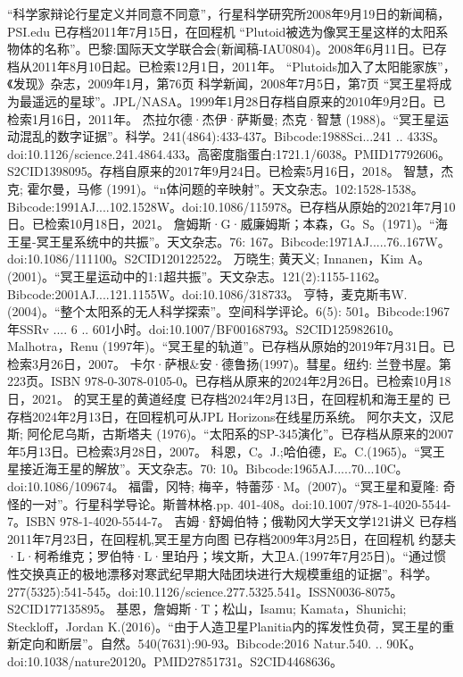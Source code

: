 \begin{enumerate}
 “科学家辩论行星定义并同意不同意”，行星科学研究所2008年9月19日的新闻稿，PSI.edu 已存档2011年7月15日，在回程机
 “Plutoid被选为像冥王星这样的太阳系物体的名称”。巴黎:国际天文学联合会(新闻稿-IAU0804)。2008年6月11日。已存档从2011年8月10日起。已检索12月1日，2011年。
 “Plutoids加入了太阳能家族”，《发现》杂志，2009年1月，第76页
 科学新闻，2008年7月5日，第7页
 “冥王星将成为最遥远的星球”。JPL/NASA。1999年1月28日存档自原来的2010年9月2日。已检索1月16日，2011年。
 杰拉尔德·杰伊·萨斯曼; 杰克·智慧 (1988)。“冥王星运动混乱的数字证据”。科学。241(4864):433-437。Bibcode:1988Sci...241 .. 433S。doi:10.1126/science.241.4864.433。高密度脂蛋白:1721.1/6038。PMID17792606。S2CID1398095。存档自原来的2017年9月24日。已检索5月16日，2018。  
 智慧，杰克; 霍尔曼，马修 (1991)。“n体问题的辛映射”。天文杂志。102:1528-1538。Bibcode:1991AJ....102.1528W。doi:10.1086/115978。已存档从原始的2021年7月10日。已检索10月18日，2021。
 詹姆斯·G·威廉姆斯；本森，G。S。(1971)。“海王星-冥王星系统中的共振”。天文杂志。76: 167。Bibcode:1971AJ.....76..167W。doi:10.1086/111100。S2CID120122522。 
 万晓生; 黄天义; Innanen，Kim A。(2001)。“冥王星运动中的1:1超共振”。天文杂志。121(2):1155-1162。Bibcode:2001AJ....121.1155W。doi:10.1086/318733。
 亨特，麦克斯韦W.(2004)。“整个太阳系的无人科学探索”。空间科学评论。6(5): 501。Bibcode:1967年SSRv .... 6 .. 601小时。doi:10.1007/BF00168793。S2CID125982610。 
 Malhotra，Renu (1997年)。“冥王星的轨道”。已存档从原始的2019年7月31日。已检索3月26日，2007。
 卡尔·萨根&安·德鲁扬(1997)。彗星。纽约: 兰登书屋。第223页。ISBN 978-0-3078-0105-0。已存档从原来的2024年2月26日。已检索10月18日，2021。
 的冥王星的黄道经度 已存档2024年2月13日，在回程机和海王星的 已存档2024年2月13日，在回程机可从JPL Horizons在线星历系统。
 阿尔夫文，汉尼斯; 阿伦尼乌斯，古斯塔夫 (1976)。“太阳系的SP-345演化”。已存档从原来的2007年5月13日。已检索3月28日，2007。
 科恩，C。J.;哈伯德，E。C.(1965)。“冥王星接近海王星的解放”。天文杂志。70: 10。Bibcode:1965AJ.....70...10C。doi:10.1086/109674。
 福雷，冈特; 梅辛，特蕾莎·M。(2007)。“冥王星和夏隆: 奇怪的一对”。行星科学导论。斯普林格.pp. 401-408。doi:10.1007/978-1-4020-5544-7。ISBN 978-1-4020-5544-7。
 吉姆·舒姆伯特；俄勒冈大学天文学121讲义 已存档2011年7月23日，在回程机,冥王星方向图 已存档2009年3月25日，在回程机
 约瑟夫·L·柯希维克；罗伯特·L·里珀丹；埃文斯，大卫A.(1997年7月25日)。“通过惯性交换真正的极地漂移对寒武纪早期大陆团块进行大规模重组的证据”。科学。277(5325):541-545。doi:10.1126/science.277.5325.541。ISSN0036-8075。S2CID177135895。  
 基恩，詹姆斯·T；松山，Isamu; Kamata，Shunichi; Steckloff，Jordan K.(2016)。“由于人造卫星Planitia内的挥发性负荷，冥王星的重新定向和断层”。自然。540(7631):90-93。Bibcode:2016 Natur.540. .. 90K。doi:10.1038/nature20120。PMID27851731。S2CID4468636。  

\end{enumerate}
